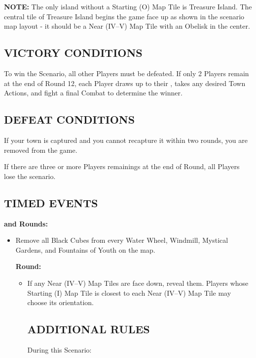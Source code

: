\begin{multicols*}{2}
\begin{itemize}
\textbf{\MakeUppercase{Note:}} The only island without a Starting (O) Map Tile is Treasure Island. The central tile of Treasure Island begins the game face up as shown in the scenario map layout - it should be a Near (IV--V) Map Tile with an Obelisk in the center.

\subsection*{\MakeUppercase{Victory Conditions}}
To win the Scenario, all other Players must be defeated. If only 2 Players remain at the end of Round 12, each Player draws up to their , takes any desired Town Actions, and fight a final Combat to determine the winner.

\subsection*{\MakeUppercase{Defeat Conditions}}
If your town is captured and you cannot recapture it within two rounds, you are removed from the game.

If there are three or more Players remainings at the end of  Round, all Players lose the scenario.

\subsection*{\MakeUppercase{Timed Events}}

\textbf{ and  Rounds:}
\begin{itemize}
  \item Remove all Black Cubes from every Water Wheel, Windmill, Mystical Gardens, and Fountains of Youth on the map.

\textbf{ Round:}
\begin{itemize}
  \item If any Near (IV--V) Map Tiles are face down, reveal them. Players whose Starting (I) Map Tile is closest to each Near (IV--V) Map Tile may choose its orientation.

\subsection*{\MakeUppercase{Additional Rules}}

During this Scenario:


\end{itemize}
\end{itemize}
\end{itemize}
\end{multicols*}
